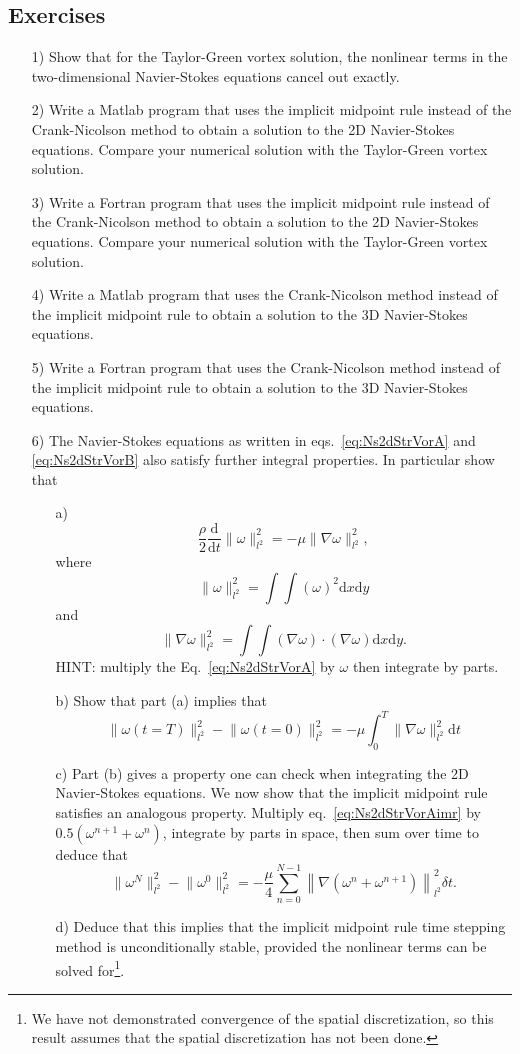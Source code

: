 \subsection{Exercises}
\begin{enumerate}
\item[1)] Show that for the Taylor-Green vortex solution, the nonlinear terms in the two-dimensional Navier-Stokes equations cancel out exactly.
\item[2)] Write a Matlab program that uses the implicit midpoint rule instead of the Crank-Nicolson method to obtain a solution to the 2D Navier-Stokes equations. Compare your numerical solution with the Taylor-Green vortex solution.
\item[3)] Write a Fortran program that uses the implicit midpoint rule instead of the Crank-Nicolson method to obtain a solution to the 2D Navier-Stokes equations. Compare your numerical solution with the Taylor-Green vortex solution.
\item[4)] Write a Matlab program that uses the Crank-Nicolson method instead of the implicit midpoint rule  to obtain a solution to the 3D Navier-Stokes equations. 
\item[5)] Write a Fortran  program that uses the Crank-Nicolson method instead of the implicit midpoint rule  to obtain a solution to the 3D Navier-Stokes equations.
\item[6)] The Navier-Stokes equations as written in eqs.\ \eqref{eq:Ns2dStrVorA} and \eqref{eq:Ns2dStrVorB} also satisfy further integral properties. In particular show that
\begin{enumerate}
\item[a)] $$\frac{\rho}{2}\frac{\mathrm{d}}{\mathrm{d}t}\lVert \omega \rVert_{l^2}^2= -\mu\lVert \nabla \omega \rVert_{l^2}^2,$$
where 
$$\lVert \omega \rVert_{l^2}^2=\int\int(\omega)^2\mathrm{d}x\mathrm{d}y$$
and
$$\lVert \nabla \omega \rVert_{l^2}^2=\int\int(\nabla\omega)\cdot(\nabla\omega)\mathrm{d}x\mathrm{d}y.$$
HINT: multiply the Eq.\ \eqref{eq:Ns2dStrVorA} by $\omega$ then integrate by parts. 
\item[b)] Show that part (a) implies that 
$$\lVert \omega(t=T) \rVert_{l^2}^2-\lVert \omega(t=0) \rVert_{l^2}^2=-\mu\int_0^T\lVert \nabla \omega \rVert_{l^2}^2\mathrm{d}t$$
\item[c)] Part (b) gives a property one can check when integrating the 2D Navier-Stokes equations. We now show that the implicit midpoint rule satisfies an analogous property. Multiply eq.\ \eqref{eq:Ns2dStrVorAimr} by $0.5(\omega^{n+1}+\omega^n)$, integrate by parts in space, then sum over time to deduce that
$$\lVert \omega^N \rVert_{l^2}^2-\lVert \omega^0 \rVert_{l^2}^2=-\frac{\mu}{4}\sum_{n=0}^{N-1}\left\lVert \nabla\left( \omega^n+\omega^{n+1}\right) \right\rVert_{l^2}^2\delta t.$$
\item[d)] Deduce that this implies that the implicit midpoint rule time stepping method is unconditionally stable, provided the nonlinear terms can be solved for\footnote{We have not demonstrated convergence of the spatial discretization, so this result assumes that the spatial discretization has not been done.}.
\end{enumerate}
\end{enumerate}

